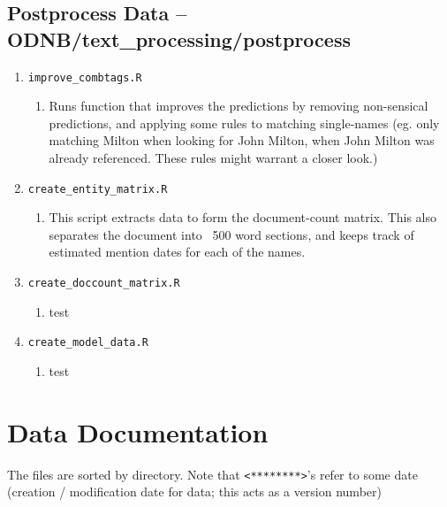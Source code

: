 \documentclass[11pt]{article}
\newcommand{\filename}[1]{\texttt{#1}}
\begin{document}
\subsection{Postprocess Data -- ODNB/text\_processing/postprocess}
\begin{enumerate}

\item \filename{improve\_combtags.R}
\begin{enumerate}
\item Runs function that improves the predictions by removing non-sensical predictions, and applying some rules to matching single-names (eg. only matching Milton when looking for John Milton, when John Milton was already referenced. These rules might warrant a closer look.)

\end{enumerate}

\item \filename{create\_entity\_matrix.R}
\begin{enumerate}
\item This script extracts data to form the document-count matrix. This also separates the document into ~500 word sections, and keeps track of estimated mention dates for each of the names. 
\end{enumerate}

\item \filename{create\_doccount\_matrix.R}

\begin{enumerate}
\item test
\end{enumerate}



\item \filename{create\_model\_data.R}
\begin{enumerate}
\item test
\end{enumerate}




\end{enumerate}




\section{Data Documentation}
The files are sorted by directory. Note that \texttt{<********>}'s refer to some date (creation / modification date for data; this acts as a version number)
\end{document}

